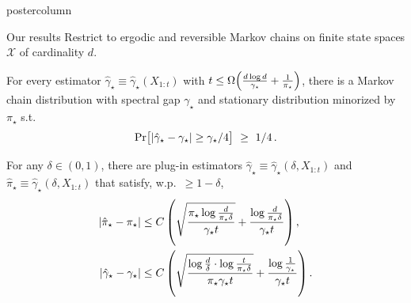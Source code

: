 \documentclass[notheorems,final]{beamer}
\newcommand{\GREEN}[1]{\textcolor{boldgreen}{#1}}
\newcommand\pimin{\ensuremath{\pi_{\star}}}
\newcommand\gap{\ensuremath{\gamma_{\star}}}
\newcommand\hatgap{\ensuremath{\hat{\gamma}_{\star}}}
\newcommand\hatpimin{\ensuremath{\hat{\pi}_{\star}}}
\newcommand\states{\ensuremath{\mathcal{X}}}
\begin{document}
\begin{frame}{}
\begin{columns}
\begin{column}{0.24\textwidth}
\begin{beamercolorbox}[center,wd=\textwidth]{postercolumn}
\begin{minipage}[T]{.95\textwidth}
{              \begin{block}{Our results}
                Restrict to \GREEN{ergodic and reversible Markov
                chains} on \GREEN{finite state spaces} $\states$ of
                cardinality $d$.

                \vspace{1cm}
                \begin{theorem}
                  For every estimator $\hatgap \equiv
                  \hatgap(X_{1:t})$ with $t \leq \Omega\Parens{
                  \frac{d \log d}{\gap} + \frac1{\pimin} }$, there is
                  a Markov chain distribution with spectral gap $\gap$
                  and stationary distribution minorized by $\pimin$
                  s.t.
                  \[
                    \Pr\Brackets{ |\hatgap - \gap| \geq \gap/4 }
                    \ \geq \ 1/4
                    \,.
                  \]
                \end{theorem}

                \begin{theorem}
                  For any $\delta{\in}(0,1)$, there are plug-in estimators
                  $\hatgap \equiv \hatgap(\delta,X_{1:t})$ and
                  $\hatpimin \equiv \hatgap(\delta,X_{1:t})$ that satisfy,
                  w.p.~${\geq}1-\delta$,
                  \begin{align*}
                    \Abs{\hatpimin-\pimin}
                    & \leq
                    C \,
                    \Parens{
                      \sqrt{\frac{\pimin\log\frac{d}{\pimin\delta}}{\gap t}}
                      +
                      \frac{\log\frac{d}{\pimin\delta}}{\gap t}
                    }
                    \,,
                    \\
                    \Abs{\hatgap-\gap}
                    & \leq
                    C \,
                    \Parens{
                      \sqrt{\frac{\log\frac{d}{\delta}\cdot\log\frac{t}{\pimin\delta}}{\pimin\gap t}}
                      + \frac{\log\frac{1}{\gap}}{\gap t}  
                    }
                    \,.
                  \end{align*}
                \end{theorem}


\end{block}}
\end{minipage}
\end{beamercolorbox}
\end{column}
\end{columns}
\end{frame}
\end{document}
